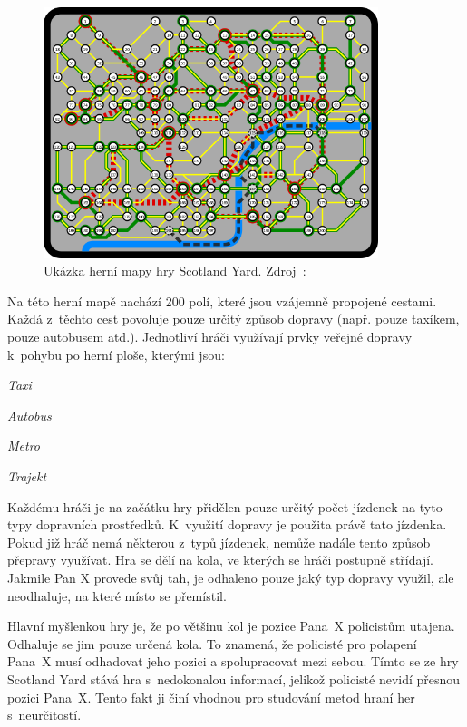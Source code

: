 \begin{figure}[H]
	\centering
	\includegraphics[width=0.87\textwidth]{obrazky-figures/scotland_original}
	\caption{Ukázka herní mapy hry Scotland Yard.
  Zdroj~\cite{scotland_original_image}:}\label{fig:figure}
\end{figure}
\newpage

Na této herní mapě nachází 200 polí, které jsou vzájemně propojené cestami.
Každá z~těchto cest povoluje pouze určitý způsob dopravy (např.
pouze taxíkem, pouze autobusem atd.).
Jednotliví hráči využívají prvky veřejné dopravy k~pohybu po herní ploše, kterými jsou:

\begin{myitemize}
  \item \emph{Taxi}
  \item \emph{Autobus}
  \item \emph{Metro}
  \item \emph{Trajekt}
\end{myitemize}

Každému hráči je na začátku hry přidělen pouze určitý počet jízdenek na tyto typy dopravních prostředků.
K~využití dopravy je použita právě tato jízdenka.
Pokud již hráč nemá některou z~typů jízdenek, nemůže nadále tento způsob přepravy využívat.
Hra se dělí na kola, ve kterých se hráči postupně střídají.
Jakmile Pan X provede svůj tah, je odhaleno pouze jaký typ dopravy využil, ale neodhaluje, na které místo se přemístil.

Hlavní myšlenkou hry je, že po většinu kol je pozice Pana~X policistům utajena.
Odhaluje se jim pouze určená kola.
To znamená, že policisté pro polapení Pana~X musí odhadovat jeho pozici a spolupracovat mezi sebou.
Tímto se ze hry Scotland Yard stává hra s~nedokonalou informací, jelikož policisté nevidí přesnou pozici Pana~X\@.
Tento fakt ji činí vhodnou pro studování metod hraní her s~neurčitostí.


